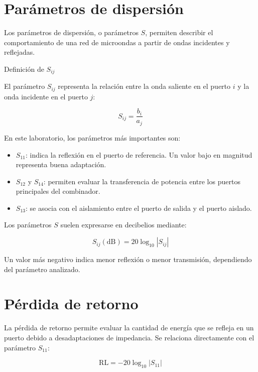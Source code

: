 \section{Parámetros de dispersión}

Los parámetros de dispersión, o parámetros $S$, permiten describir el comportamiento de una red de microondas a partir de ondas incidentes y reflejadas. 
\begin{conceptcard}{Definición de $S_{ij}$}

El parámetro $S_{ij}$ representa la relación entre la onda saliente en el puerto $i$ y la onda incidente en el puerto $j$:

\begin{equation}
S_{ij}=\frac{b_i}{a_j}
\end{equation}

\end{conceptcard}

En este laboratorio, los parámetros más importantes son:

\begin{itemize}
\item $S_{11}$: indica la reflexión en el puerto de referencia. Un valor bajo en magnitud representa buena adaptación.
\item $S_{12}$ y $S_{14}$: permiten evaluar la transferencia de potencia entre los puertos principales del combinador.
\item $S_{13}$: se asocia con el aislamiento entre el puerto de salida y el puerto aislado.
\end{itemize}

Los parámetros $S$ suelen expresarse en decibelios mediante:

\begin{equation}
S_{ij}(\text{dB}) = 20\log_{10}\left|S_{ij}\right|
\end{equation}

Un valor más negativo indica menor reflexión o menor transmisión, dependiendo del parámetro analizado.

\section{Pérdida de retorno}

La pérdida de retorno permite evaluar la cantidad de energía que se refleja en un puerto debido a desadaptaciones de impedancia. Se relaciona directamente con el parámetro $S_{11}$:

\begin{equation}
\text{RL} = -20\log_{10}\left|S_{11}\right|
\end{equation}

